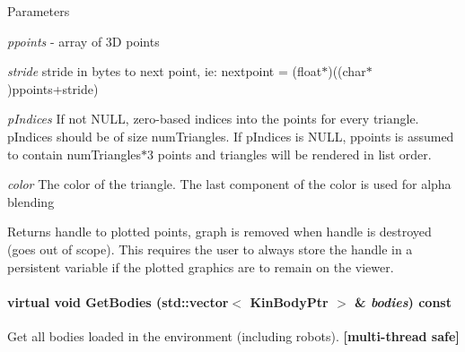 \begin{DoxyParams}{Parameters}
\item[{\em ppoints}]-\/ array of 3D points \item[{\em stride}]stride in bytes to next point, ie: nextpoint = (float$\ast$)((char$\ast$)ppoints+stride) \item[{\em pIndices}]If not NULL, zero-\/based indices into the points for every triangle. pIndices should be of size numTriangles. If pIndices is NULL, ppoints is assumed to contain numTriangles$\ast$3 points and triangles will be rendered in list order. \item[{\em color}]The color of the triangle. The last component of the color is used for alpha blending \end{DoxyParams}
\begin{DoxyReturn}{Returns}
handle to plotted points, graph is removed when handle is destroyed (goes out of scope). This requires the user to always store the handle in a persistent variable if the plotted graphics are to remain on the viewer. 
\end{DoxyReturn}
\hypertarget{classOpenRAVE_1_1EnvironmentBase_a7d408bb4332225ed07ac388b13d11a59}{
\paragraph[{GetBodies}]{\setlength{\rightskip}{0pt plus 5cm}virtual void GetBodies (std::vector$<$ KinBodyPtr $>$ \& {\em bodies}) const}\hfill}
\label{classOpenRAVE_1_1EnvironmentBase_a7d408bb4332225ed07ac388b13d11a59}


Get all bodies loaded in the environment (including robots). {\bfseries \mbox{[}multi-\/thread safe\mbox{]}} 


